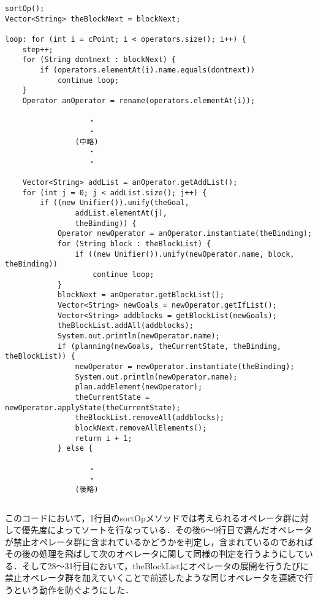 \documentclass[a4j]{jarticle}
\begin{document}
\begin{lstlisting}[caption=PlannerクラスのplanningAGoalメソッドより変更点を抜粋]
sortOp();
Vector<String> theBlockNext = blockNext;

loop: for (int i = cPoint; i < operators.size(); i++) {
	step++;
	for (String dontnext : blockNext) {
		if (operators.elementAt(i).name.equals(dontnext))
			continue loop;
	}
	Operator anOperator = rename(operators.elementAt(i));
	
				   ・
				   ・
				(中略)
				   ・
				   ・
				   
	Vector<String> addList = anOperator.getAddList();
	for (int j = 0; j < addList.size(); j++) {
		if ((new Unifier()).unify(theGoal,
				addList.elementAt(j),
				theBinding)) {
			Operator newOperator = anOperator.instantiate(theBinding);
			for (String block : theBlockList) {
				if ((new Unifier()).unify(newOperator.name, block, theBinding))
					continue loop;
			}
			blockNext = anOperator.getBlockList();
			Vector<String> newGoals = newOperator.getIfList();
			Vector<String> addblocks = getBlockList(newGoals);
			theBlockList.addAll(addblocks);
			System.out.println(newOperator.name);
			if (planning(newGoals, theCurrentState, theBinding, theBlockList)) {
				newOperator = newOperator.instantiate(theBinding);
				System.out.println(newOperator.name);
				plan.addElement(newOperator);
				theCurrentState = newOperator.applyState(theCurrentState);
				theBlockList.removeAll(addblocks);
				blockNext.removeAllElements();
				return i + 1;
			} else {
			
				   ・
				   ・
				(後略)

\end{lstlisting}
\begin{verbatim}

\end{verbatim}
このコードにおいて，1行目のsortOpメソッドでは考えられるオペレータ群に対して優先度によってソートを行なっている．その後6〜9行目で選んだオペレータが禁止オペレータ群に含まれているかどうかを判定し，含まれているのであればその後の処理を飛ばして次のオペレータに関して同様の判定を行うようにしている．そして28〜31行目において，theBlockListにオペレータの展開を行うたびに禁止オペレータ群を加えていくことで前述したような同じオペレータを連続で行うという動作を防ぐようにした．
\end{document}

